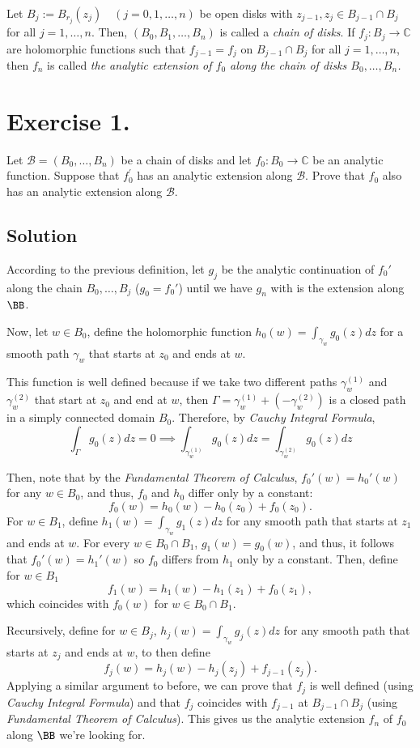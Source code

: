 
Let $B_{j} := B_{r_{j}}(z_{j}) \quad (j = 0, 1, \ldots, n)$ be open disks with $z_{j-1}, z_{j} \in B_{j-1} \cap B_{j}$ for all $j = 1, \dots, n$. Then, $(B_{0}, B_{1}, \ldots, B_{n})$ is called a \textit{chain of disks}. If $f_{j} \colon B_{j} \to \mathbb{C}$ are holomorphic functions such that $f_{j-1} = f_{j}$ on $B_{j-1} \cap B_{j}$ for all $j = 1, \ldots, n$, then $f_{n}$ is called \textit{the analytic extension of $f_{0}$ along the chain of disks $B_{0}, \ldots, B_{n}$.}

\section*{Exercise 1.}

Let $\mathcal{B} = (B_{0}, \ldots, B_{n})$ be a chain of disks and let $f_{0} : B_{0} \to \mathbb{C}$ be an analytic function. Suppose that $f_{0}^{\prime}$ has an analytic extension along $\mathcal{B}$. Prove that $f_{0}$ also has an analytic extension along $\mathcal{B}$.

\subsection*{Solution}

According to the previous definition, let $g_j$ be the analytic continuation of $f_0'$ along the chain $B_0,\ldots, B_j$ ($g_0 = f_0'$) until we have $g_n$ with is the extension along $\BB$.

Now, let $w \in B_0$, define the holomorphic function $h_0(w) = \int_{\gamma_w}g_0(z) dz$ for a smooth path $\gamma_w$ that starts at $z_0$ and ends at $w$. 

This function is well defined because if we take two different paths $\gamma_w^{(1)}$ and $\gamma_w^{(2)}$ that start at $z_0$ and end at $w$, then $\Gamma = \gamma_w^{(1)} + (-\gamma_w^{(2)})$ is a closed path in a simply connected domain $B_0$. Therefore, by \textit{Cauchy Integral Formula},
\[ \int_\Gamma g_0(z) dz = 0 \implies \int_{\gamma_{w}^{(1)}} g_0(z) dz = \int_{\gamma_{w}^{(2)}} g_0(z) dz \]

Then, note that by the \textit{Fundamental Theorem of Calculus}, $f_0'(w) = h_0'(w)$ for any $w \in B_0$, and thus, $f_0$ and $h_0$ differ only by a constant:
\[ f_0(w) = h_0(w) - h_0(z_0) + f_0(z_0).  \]
For $w \in B_1$, define $h_1(w) = \int_{\gamma_w} g_1(z) dz$ for any smooth path that starts at $z_1$ and ends at $w$. For every $w \in B_0 \cap B_1$, $g_1(w) = g_0(w)$, and thus, it follows that $f_0'(w) = h_1'(w)$ so $f_0$ differs from $h_1$ only by a constant. Then, define for $w \in B_1$
\[ f_1(w) = h_1(w) - h_1(z_1) + f_0(z_1), \]
which coincides with $f_0(w)$ for $w\in B_0\cap B_1$.

Recursively, define for $w \in B_j$, $h_j(w) = \int_{\gamma_w} g_j(z) dz$ for any smooth path that starts at $z_j$ and ends at $w$, to then define
\[ f_j(w) = h_j(w) - h_j(z_j) + f_{j-1}(z_j). \]
Applying a similar argument to before, we can prove that $f_j$ is well defined (using \textit{Cauchy Integral Formula}) and that $f_j$ coincides with $f_{j-1}$ at $B_{j-1} \cap B_j$ (using \textit{Fundamental Theorem of Calculus}). This gives us the analytic extension $f_n$ of $f_0$ along $\BB$ we're looking for.
